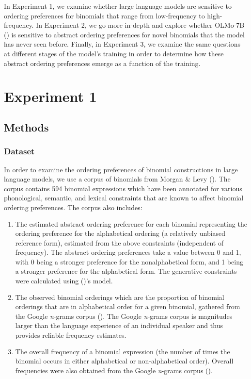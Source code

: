\documentclass[
  12pt,
  letterpaper,
]{scrreport}
\begin{document}
In Experiment 1, we examine whether large language models are sensitive
to ordering preferences for binomials that range from low-frequency to
high-frequency. In Experiment 2, we go more in-depth and explore whether
OLMo-7B () is sensitive to abstract ordering preferences for novel
binomials that the model has never seen before. Finally, in Experiment
3, we examine the same questions at different stages of the model's
training in order to determine how these abstract ordering preferences
emerge as a function of the training.

\section{Experiment 1}\label{experiment-1-1}

\subsection{Methods}\label{methods-5}

\subsubsection{Dataset}\label{dataset}

In order to examine the ordering preferences of binomial constructions
in large language models, we use a corpus of binomials from Morgan \&
Levy (). The corpus contains 594 binomial
expressions which have been annotated for various phonological,
semantic, and lexical constraints that are known to affect binomial
ordering preferences. The corpus also includes:

\begin{enumerate}
\def\labelenumi{\arabic{enumi}.}
\item
  The estimated abstract ordering preference for each binomial
  representing the ordering preference for the alphabetical ordering (a
  relatively unbiased reference form), estimated from the above
  constraints (independent of frequency). The abstract ordering
  preferences take a value between 0 and 1, with 0 being a stronger
  preference for the nonalphabetical form, and 1 being a stronger
  preference for the alphabetical form. The generative constraints were
  calculated using ()'s
  model.
\item
  The observed binomial orderings which are the proportion of binomial
  orderings that are in alphabetical order for a given binomial,
  gathered from the Google \emph{n}-grams corpus
  ().
  The Google \emph{n}-grams corpus is magnitudes larger than the
  language experience of an individual speaker and thus provides
  reliable frequency estimates.
\item
  The overall frequency of a binomial expression (the number of times
  the binomial occurs in either alphabetical or non-alphabetical order).
  Overall frequencies were also obtained from the Google \emph{n}-grams
  corpus ().
\end{enumerate}
\end{document}
